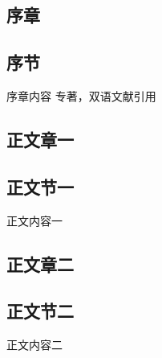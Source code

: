\documentclass{book}
\begin{document}
\pagestyle{premain}
\tableofcontents
\cleardoublepage

\begin{refsection}
\pagestyle{main}
\chapter{序章}
\section{序节}
序章内容\cite{GPS1988--}
专著，双语文献引用\cite{bilangyi2013}
\pagestyle{pgref}
\printbibliography[heading=bibliography,title=本章参考文献]
\cleardoublepage%
\end{refsection}

\begin{refsection}
\pagestyle{main}
\chapter{正文章一}
\section{正文节一}
正文内容一\cite{杨洪升2013-56-75}
\pagestyle{pgref}
\printbibliography[heading=subbibliography,title=本章参考文献]
\cleardoublepage
\end{refsection}

\begin{refsection}
\pagestyle{main}
\chapter{正文章二}
\section{正文节二}
正文内容二\cite{马克思2013-302-302}
\pagestyle{pgref}
\printbibliography[heading=subbibliography,title=本章参考文献]
\cleardoublepage
\end{refsection}
\end{document}

